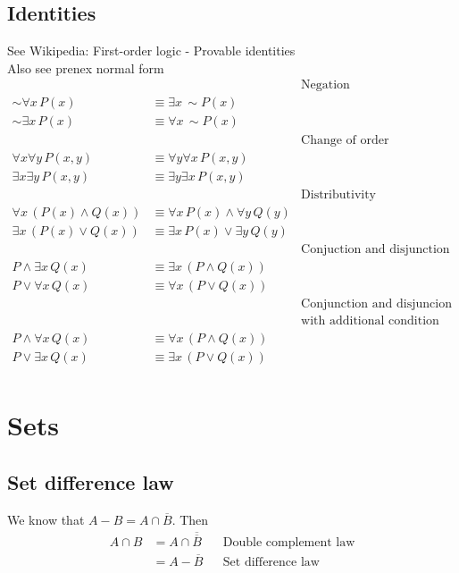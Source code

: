 \documentclass{article}
\begin{document}
\subsection{Identities}
See Wikipedia: First-order logic - Provable identities\\
Also see prenex normal form
\begin{align*}
    &&\text{Negation}\\
    \sim \forall x\, P(x)&\equiv \exists x\, \sim P(x)\\
    \sim \exists x\, P(x)&\equiv \forall x\, \sim P(x)\\
    &&\text{Change of order}\\
    \forall x\forall y\, P(x, y)&\equiv \forall y\forall x\, P(x, y)\\
    \exists x\exists y\, P(x, y)&\equiv \exists y\exists x\, P(x, y)\\
    &&\text{Distributivity}\\
    \forall x\, (P(x)\land Q(x))&\equiv \forall x\, P(x)\land \forall y\, Q(y)\\
    \exists x\, (P(x)\lor Q(x))&\equiv \exists x\, P(x) \lor \exists y\, Q(y)\\
    &&\text{Conjuction and disjunction}\\
    P\land \exists x\, Q(x)&\equiv \exists x\, (P\land Q(x))\\
    P\lor \forall x\, Q(x)&\equiv \forall x\, (P\lor Q(x))\\
    &&\text{Conjunction and disjuncion}\\
    &&\text{with additional condition that domain of x is non-empty}\\
    P\land \forall x\, Q(x)&\equiv \forall x\, (P\land Q(x))\\
    P\lor \exists x\, Q(x)&\equiv \exists x\, (P\lor Q(x))\\
\end{align*}

\section{Sets}
\subsection{Set difference law}
We know that $A-B=A\cap \overline{B}$.
Then
\begin{align*}
    A\cap B&=A\cap \overline{\overline{B}} &&\text{Double complement law}\\
    &=A-\overline{B} &&\text{Set difference law}
\end{align*}
\end{document}
